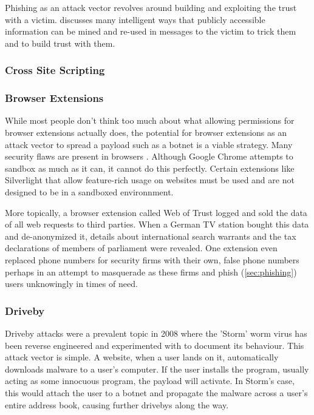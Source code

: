 \documentclass[a4paper, 11pt]{article}
\begin{document}
Phishing as an attack vector revolves around building and exploiting the trust with a victim. \cite{ref:phishing} discusses many intelligent ways that publicly accessible information can be mined and re-used in messages to the victim to trick them and to build trust with them. 

\subsubsection{Cross Site Scripting}
\label{sec:xss}

\subsubsection{Browser Extensions}
\label{sec:extensions}
While most people don't think too much about what allowing permissions for browser extensions actually does, the potential for browser extensions as an attack vector to spread a payload such as a botnet is a viable strategy. Many security flaws are present in browsers \cite{ref:reis2009browser, ref:soghoian2007remote}. Although Google Chrome attempts to sandbox as much as it can, it cannot do this perfectly. Certain extensions like Silverlight that allow feature-rich usage on websites must be used and are not designed to be in a sandboxed environnment. \cite{ref:reis2009browser}

More topically, a browser extension called Web of Trust logged and sold the data of all web requests to third parties. When a German TV station bought this data and de-anonymized it, details about international search warrants and the tax declarations of members of parliament were revealed. \cite{ref:brucker2017evil} One extension even replaced phone numbers for security firms with their own, false phone numbers perhaps in an attempt to masquerade as these firms and phish (\ref{sec:phishing}) users unknowingly in times of need.

\subsubsection{Driveby}
\label{sec:driveby}
Driveby attacks were a prevalent topic in 2008 \cite{ref:kanich2008spamalytics} where the 'Storm' worm virus has been reverse engineered and experimented with to document its behaviour. This attack vector is simple. A website, when a user lands on it, automatically downloads malware to a user's computer. If the user installs the program, usually acting as some innocuous program, the payload will activate. In Storm's case, this would attach the user to a botnet and propagate the malware across a user's entire address book, causing further drivebys along the way.
\end{document}
